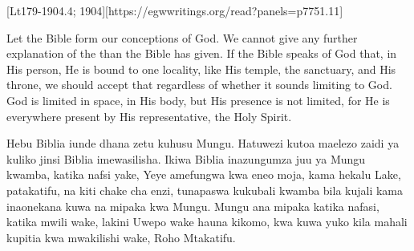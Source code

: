 [Lt179-1904.4; 1904][https://egwwritings.org/read?panels=p7751.11]


Let the Bible form our conceptions of God. We cannot give any further explanation of the  than the Bible has given. If the Bible speaks of God that, in His person, He is bound to one locality, like His temple, the sanctuary, and His throne, we should accept that regardless of whether it sounds limiting to God. God is limited in space, in His body, but His presence is not limited, for He is everywhere present by His representative, the Holy Spirit.


Hebu Biblia iunde dhana zetu kuhusu Mungu. Hatuwezi kutoa maelezo zaidi ya  kuliko jinsi Biblia imewasilisha. Ikiwa Biblia inazungumza juu ya Mungu kwamba, katika nafsi yake, Yeye amefungwa kwa eneo moja, kama hekalu Lake, patakatifu, na kiti chake cha enzi, tunapaswa kukubali kwamba bila kujali kama inaonekana kuwa na mipaka kwa Mungu. Mungu ana mipaka katika nafasi, katika mwili wake, lakini Uwepo wake hauna kikomo, kwa kuwa yuko kila mahali kupitia kwa mwakilishi wake, Roho Mtakatifu.


